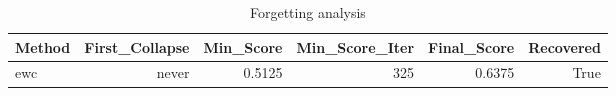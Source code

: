 \begin{table}[htbp]
\centering
\caption{Forgetting analysis}
\label{tab:forgetting}
\begin{tabular}{lrrrrr}
\toprule
\textbf{Method} & \textbf{First\_Collapse} & \textbf{Min\_Score} & \textbf{Min\_Score\_Iter} & \textbf{Final\_Score} & \textbf{Recovered} \\
\midrule
ewc & never & 0.5125 & 325 & 0.6375 & True \\
\bottomrule
\end{tabular}
\end{table}